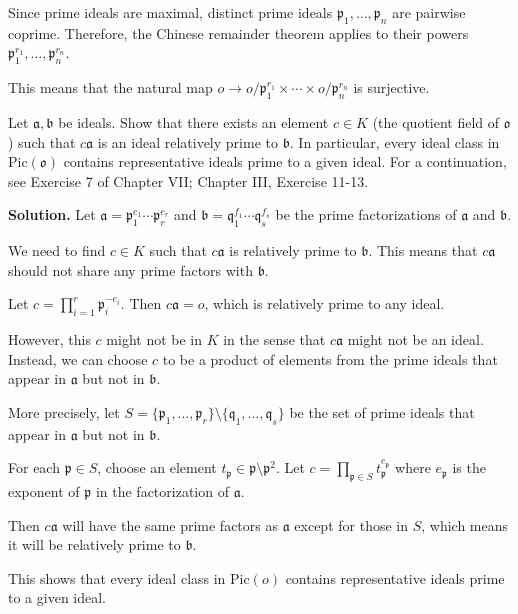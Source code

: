 Since prime ideals are maximal, distinct prime ideals $\mathfrak{p}_1, \ldots, \mathfrak{p}_n$ are pairwise coprime. Therefore, the Chinese remainder theorem applies to their powers $\mathfrak{p}_1^{r_1}, \ldots, \mathfrak{p}_n^{r_n}$.

This means that the natural map $o \rightarrow o/\mathfrak{p}_1^{r_1} \times \cdots \times o/\mathfrak{p}_n^{r_n}$ is surjective.

\begin{problembox}
Let $\mathfrak{a}, \mathfrak{b}$ be ideals. Show that there exists an element $c \in K$ (the quotient field of $\mathfrak{o}$) such that $c\mathfrak{a}$ is an ideal relatively prime to $\mathfrak{b}$. In particular, every ideal class in $\text{Pic}(\mathfrak{o})$ contains representative ideals prime to a given ideal. For a continuation, see Exercise 7 of Chapter VII; Chapter III, Exercise 11-13.
\end{problembox}

\noindent\textbf{Solution.}
Let $\mathfrak{a} = \mathfrak{p}_1^{e_1} \cdots \mathfrak{p}_r^{e_r}$ and $\mathfrak{b} = \mathfrak{q}_1^{f_1} \cdots \mathfrak{q}_s^{f_s}$ be the prime factorizations of $\mathfrak{a}$ and $\mathfrak{b}$.

We need to find $c \in K$ such that $c\mathfrak{a}$ is relatively prime to $\mathfrak{b}$. This means that $c\mathfrak{a}$ should not share any prime factors with $\mathfrak{b}$.

Let $c = \prod_{i=1}^r \mathfrak{p}_i^{-e_i}$. Then $c\mathfrak{a} = o$, which is relatively prime to any ideal.

However, this $c$ might not be in $K$ in the sense that $c\mathfrak{a}$ might not be an ideal. Instead, we can choose $c$ to be a product of elements from the prime ideals that appear in $\mathfrak{a}$ but not in $\mathfrak{b}$.

More precisely, let $S = \{\mathfrak{p}_1, \ldots, \mathfrak{p}_r\} \setminus \{\mathfrak{q}_1, \ldots, \mathfrak{q}_s\}$ be the set of prime ideals that appear in $\mathfrak{a}$ but not in $\mathfrak{b}$.

For each $\mathfrak{p} \in S$, choose an element $t_{\mathfrak{p}} \in \mathfrak{p} \setminus \mathfrak{p}^2$. Let $c = \prod_{\mathfrak{p} \in S} t_{\mathfrak{p}}^{e_{\mathfrak{p}}}$ where $e_{\mathfrak{p}}$ is the exponent of $\mathfrak{p}$ in the factorization of $\mathfrak{a}$.

Then $c\mathfrak{a}$ will have the same prime factors as $\mathfrak{a}$ except for those in $S$, which means it will be relatively prime to $\mathfrak{b}$.

This shows that every ideal class in $\text{Pic}(o)$ contains representative ideals prime to a given ideal.
